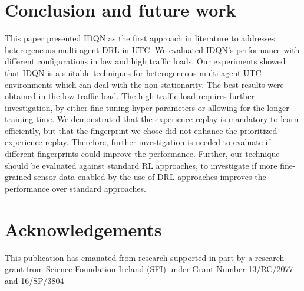 \documentclass{llncs}
\begin{document}
\section{Conclusion and future work} \label{conclusion}

This paper presented IDQN as the first approach in literature to addresses heterogeneous multi-agent DRL in UTC. We evaluated IDQN's performance with different configurations in low and high traffic loads. Our experiments showed that IDQN is a suitable techniques for heterogeneous multi-agent UTC environments which can deal with the non-stationarity. The best results were obtained in the low traffic load. The high traffic load requires further investigation, by either fine-tuning hyper-parameters or allowing for the longer training time. We demonstrated that the experience replay is mandatory to learn efficiently, but that the fingerprint we chose did not enhance the prioritized experience replay. Therefore, further investigation is needed to evaluate if different fingerprints could improve the performance. Further, our technique should be evaluated against standard RL approaches, to investigate if more fine-grained sensor data enabled by the use of DRL approaches improves the performance over standard approaches.

\section{Acknowledgements}

This publication has emanated from research supported in part by a research grant from Science Foundation Ireland (SFI) under Grant Number 13/RC/2077 and 16/SP/3804


 
\end{document}
